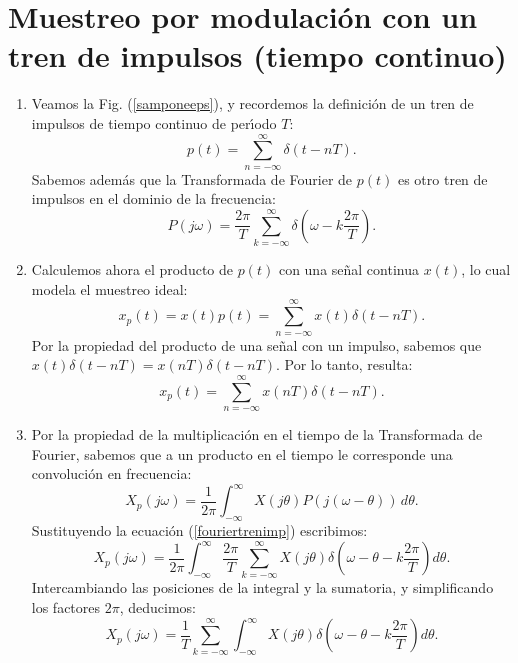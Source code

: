 \documentclass[11pt,a4paper,openany]{book}
\begin{document}
\section{Muestreo por modulaci\'{o}n con un tren de impulsos (tiempo continuo)}

\begin{enumerate}
	\item Veamos la Fig. (\ref{samponeeps}), y recordemos la definici\'{o}n de un tren de impulsos de tiempo continuo de per\'{\i}odo $T$:
	\begin{equation}
		p(t) = \sum_{n=-\infty}^{\infty} \delta(t-nT).
		\label{samptemp}
	\end{equation}
	Sabemos adem\'{a}s que la Transformada de Fourier de $p(t)$ es otro tren de impulsos en el dominio de la frecuencia:
	\begin{equation}
		P(j\omega) = \frac{2\pi}{T} \sum_{k=-\infty}^{\infty} \delta\left(\omega - k\frac{2\pi}{T}\right).
		\label{fouriertrenimp}
	\end{equation}
	
	\item Calculemos ahora el producto de $p(t)$ con una se\~{n}al continua $x(t)$, lo cual modela el muestreo ideal:
	\begin{equation}
		x_{p}(t) = x(t) p(t) = \sum_{n=-\infty}^{\infty} x(t) \delta(t-nT).
	\end{equation}
	Por la propiedad del producto de una se\~{n}al con un impulso, sabemos que $x(t) \delta(t-nT) = x(nT) \delta(t-nT)$. Por lo tanto, resulta: 
	\begin{equation}
		x_{p}(t) = \sum_{n=-\infty}^{\infty} x(nT) \delta(t-nT).
	\end{equation}
	
	\item Por la propiedad de la multiplicaci\'{o}n en el tiempo de la Transformada de Fourier, sabemos que a un producto en el tiempo le corresponde una convoluci\'{o}n en frecuencia:
	\begin{equation}
		X_{p}(j\omega) = \frac{1}{2\pi} \int_{-\infty}^{\infty} X(j\theta) P(j(\omega - \theta)) \, d\theta.
	\end{equation}
	Sustituyendo la ecuaci\'{o}n (\ref{fouriertrenimp}) escribimos:
	\begin{equation}
		X_{p}(j\omega) = \frac{1}{2\pi} \int_{-\infty}^{\infty} \frac{2\pi}{T} \sum_{k=-\infty}^{\infty} X(j\theta) \delta\left(\omega - \theta - k\frac{2\pi}{T}\right) d\theta.
	\end{equation}
	Intercambiando las posiciones de la integral y la sumatoria, y simplificando los factores $2\pi$, deducimos:
	\begin{equation}
		X_{p}(j\omega) = \frac{1}{T} \sum_{k=-\infty}^{\infty} \int_{-\infty}^{\infty} X(j\theta) \delta\left(\omega - \theta - k\frac{2\pi}{T}\right) d\theta.
	\end{equation}
	

\end{enumerate}
\end{document}
